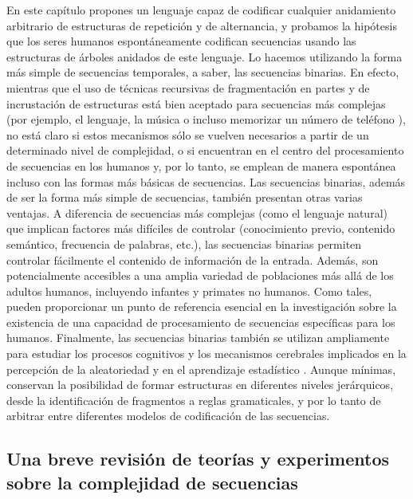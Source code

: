 En este capítulo propones un lenguaje capaz de codificar cualquier anidamiento arbitrario de estructuras de repetición y de alternancia, y probamos la hipótesis que los seres humanos espontáneamente codifican secuencias usando las estructuras de árboles anidados de este lenguaje. Lo hacemos utilizando la forma más simple de secuencias temporales, a saber, las secuencias binarias. En efecto, mientras que el uso de técnicas recursivas de fragmentación en partes y de incrustación de estructuras está bien aceptado para secuencias más complejas (por ejemplo, el lenguaje, la música o incluso memorizar un número de teléfono \cite{f16}), no está claro si estos mecanismos sólo se vuelven necesarios a partir de un determinado nivel de complejidad, o si encuentran en el centro del procesamiento de secuencias en los humanos y, por lo tanto, se emplean de manera espontánea incluso con las formas más básicas de secuencias. Las secuencias binarias, además de ser la forma más simple de secuencias, también presentan otras varias ventajas. A diferencia de secuencias más complejas (como el lenguaje natural) que implican factores más difíciles de controlar (conocimiento previo, contenido semántico, frecuencia de palabras, etc.), las secuencias binarias permiten controlar fácilmente el contenido de información de la entrada. Además, son potencialmente accesibles a una amplia variedad de poblaciones más allá de los adultos humanos, incluyendo infantes y primates no humanos. Como tales, pueden proporcionar un punto de referencia esencial en la investigación sobre la existencia de una capacidad de procesamiento de secuencias específicas para los humanos. Finalmente, las secuencias binarias también se utilizan ampliamente para estudiar los procesos cognitivos y los mecanismos cerebrales implicados en la percepción de la aleatoriedad y en el aprendizaje estadístico \cite{f17,f18,f19,f20,f21,f22}. Aunque mínimas, conservan la posibilidad de formar estructuras en diferentes niveles jerárquicos, desde la identificación de fragmentos a reglas gramaticales, y por lo tanto de arbitrar entre diferentes modelos de codificación de las secuencias. 

\subsection{Una breve revisión de teorías y experimentos sobre la complejidad de secuencias}


